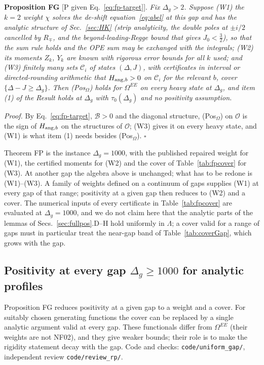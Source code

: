 \textbf{Proposition FG} [P given Eq.~\eqref{eq:fp-target}]. \emph{Fix $\Delta_g>2$. Suppose (W1) the $k=2$ weight $\chi$ solves the
de-shift equation~\eqref{eq:abel} at this gap and has the analytic structure of Sec.~\ref{sec:HK} (strip analyticity, the
double poles at $\pm i/2$ cancelled by $R_\mp$, and the beyond-leading-Regge bound that gives $J_0<\tfrac32$), so that the sum rule
holds and the OPE sum may be exchanged with the integrals; (W2) its moments $Z_k$, $Y_k$ are known with rigorous error bounds
for all $k$ used; and (W3) finitely many sets $\mathcal C_i$ of states $(\Delta,J)$, with certificates in interval or
directed-rounding arithmetic that $H_{{\rm ang},b}>0$ on $\mathcal C_i$ for the relevant $b$, cover $\{\Delta-J\ge\Delta_g\}$.
Then (Pos$_\Omega$) holds for $\Omega^{EE}$ on every heavy state at $\Delta_g$, and item (1) of the Result holds at $\Delta_g$ with
$\tau_0(\Delta_g)$ and no positivity assumption.}

\emph{Proof.} By Eq.~\eqref{eq:fp-target}, $\mathcal B>0$ and the diagonal structure, (Pos$_\Omega$) on $\mathcal O$ is the sign of
$H_{{\rm ang},b}$ on the structures of $\mathcal O$; (W3) gives it on every heavy state, and (W1) is what item (1) needs besides
(Pos$_\Omega$). $\square$

Theorem FP is the instance $\Delta_g=1000$, with the published repaired weight for (W1), the certified moments for (W2) and the
cover of Table~\ref{tab:fpcover} for (W3). At another gap the algebra above is unchanged; what has to be redone is (W1)--(W3). A
family of weights defined on a continuum of gaps supplies (W1) at every gap of that range; positivity at a given gap then reduces to
(W2) and a cover. The numerical inputs of every certificate in Table~\ref{tab:fpcover} are evaluated at $\Delta_g=1000$, and we do
not claim here that the analytic parts of the lemmas of Secs.~\ref{sec:fullpos}.D--H hold uniformly in $\Lambda$; a cover valid for a
range of gaps must in particular treat the near-gap band of Table~\ref{tab:coverGap}, which grows with the gap.

\subsection{Positivity at every gap \texorpdfstring{$\Delta_g\ge1000$}{>= 1000} for analytic profiles}
\label{sec:fpanalytic}
Proposition FG reduces positivity at a given gap to a weight and a cover. For suitably chosen generating functions the cover can be
replaced by a single analytic argument valid at every gap. These functionals differ from $\Omega^{EE}$ (their weights are not NF02),
and they give weaker bounds; their role is to make the rigidity statement decay with the gap. Code and checks:
\texttt{code/uniform\_gap/}, independent review \texttt{code/review\_rp/}.

